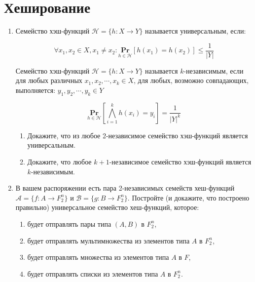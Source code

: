 \section*{Хеширование}
\begin{enumerate}
	\item Семейство хэш-функций $\mathcal{H} = \{h : X \rightarrow Y \}$ называется универсальным, если:
	
	\begin{equation*}
	\forall x_1, x_2 \in X, x_1 \neq x_2 : \underset{h \in \mathcal{H}}{\mathbf{Pr}} \left[h(x_1) = h(x_2)\right] \leqslant \frac{1}{|Y|}
	\end{equation*}
	
	Семейство хэш-функций $\mathcal{H} = \{h : X \rightarrow Y \}$ называется $k$-независимым, если для любых различных $x_1, x_2, \cdots , x_k \in X$, для любых, возможно совпадающих, выполняется: $y_1, y_2, \cdots, y_k \in Y$
	
	\begin{equation*}
	 \underset{h \in \mathcal{H}}{\mathbf{Pr}} \left[\bigwedge\limits_{i = 1}^{k} h(x_i) = y_i\right] = \frac{1}{|Y|^k}
	\end{equation*}
		
	\begin{enumerate}
		\item Докажите, что из любое 2-независимое семейство хэш-функций является универсальным.
		\item Докажите, что любое $k + 1$-независимое семейство хэш-функций является $k$-независимым.
	\end{enumerate}
	
	\item В вашем распоряжении есть пара 2-независимых семейств хеш-функций $\mathcal{A} = \{f : A \rightarrow F_2^n \}$ и $\mathcal{B} = \{g : B \rightarrow F_2^n \}$. Постройте (и докажите, что построено правильно) универсальное семейство хеш-функций, которое:
	\begin{enumerate}
		\item будет отправлять пары типа $(A, B)$ в $F_2^n$,
		\item будет отправлять мультимножества из элементов типа $A$ в $F_2^n$,
		\item будет отправлять множества из элементов типа $A$ в $F$,
		\item будет отправлять списки из элементов типа $A$ в $F_2^n$.
	\end{enumerate}
		
\end{enumerate}


